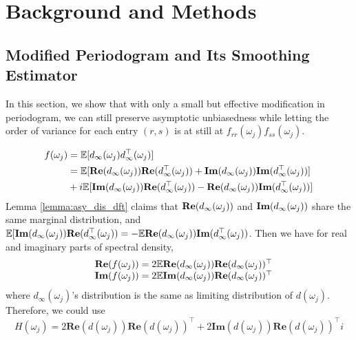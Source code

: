 \section{Background and Methods}
\label{sec:model-methods}
\subsection{Modified Periodogram and Its Smoothing Estimator}
In this section, we show that with only a small but effective modification in periodogram, we can still preserve asymptotic unbiasedness while letting the order of variance for each entry $(r,s)$ is at still at  $f_{rr}(\omega_j)f_{ss}(\omega_j)$. \par  
\begin{equation}
\begin{aligned}
f(\omega_j) & = \mathbb{E} [d_\infty (\omega_j) d^\top_\infty (\omega_j)]  \\
&  = \mathbb{E} [ {\bf Re}(d_\infty (\omega_j)){\bf Re}(d^\top_\infty (\omega_j)) + 
{\bf Im}(d_\infty (\omega_j)){\bf Im}(d^\top_\infty (\omega_j)) ] \\
& + i\mathbb{E} [ {\bf Im}(d_\infty (\omega_j)){\bf Re}(d^\top_\infty (\omega_j)) -
{\bf Re}(d_\infty (\omega_j)){\bf Im}(d^\top_\infty (\omega_j)) ]
\end{aligned}
\end{equation}
Lemma \ref{lemma:asy_dis_dft} claims that 
${\bf Re}(d_\infty (\omega_j))$ and ${\bf Im}(d_\infty (\omega_j))$ share the same marginal distribution,  and  
$\mathbb{E} [ {\bf Im}(d_\infty (\omega_j)){\bf Re}(d^\top_\infty (\omega_j)) = -\mathbb{E} 
{\bf Re}(d_\infty (\omega_j)){\bf Im}(d^\top_\infty (\omega_j)) $.  Then we have for real and imaginary parts of spectral density, 
\begin{equation}
\begin{array}{cc}
& \mathbf{Re}(f(\omega_j)) = 2 \mathbb{E} \mathbf{Re}(d_{\infty}(\omega_j))  \mathbf{Re}(d_{\infty}(\omega_j))^\top  \\
& \mathbf{Im}(f(\omega_j)) = 2\mathbb{E} \mathbf{Im}(d_{\infty}(\omega_j))  \mathbf{Re}(d_{\infty}(\omega_j))^\top 
\end{array}
\end{equation}
where $d_{\infty}(\omega_j)$'s distribution is the same as limiting distribution of $d(\omega_j)$. Therefore, we could use
\begin{equation}
H(\omega_j) = 2\mathbf{Re}(d(\omega_j))  \mathbf{Re}(d(\omega_j))^\top+2\mathbf{Im}(d(\omega_j))  \mathbf{Re}(d(\omega_j))^\top i
\end{equation}
